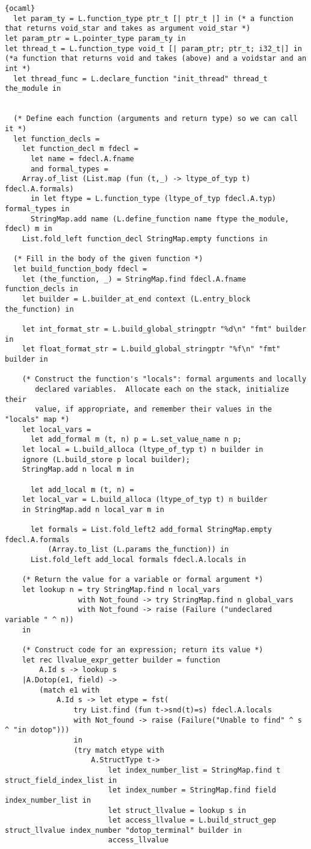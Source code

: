 \begin{lstlisting}{ocaml}
  let param_ty = L.function_type ptr_t [| ptr_t |] in (* a function that returns void_star and takes as argument void_star *)
let param_ptr = L.pointer_type param_ty in  
let thread_t = L.function_type void_t [| param_ptr; ptr_t; i32_t|] in (*a function that returns void and takes (above) and a voidstar and an int *)
  let thread_func = L.declare_function "init_thread" thread_t the_module in


  (* Define each function (arguments and return type) so we can call it *)
  let function_decls =
    let function_decl m fdecl =
      let name = fdecl.A.fname
      and formal_types =
	Array.of_list (List.map (fun (t,_) -> ltype_of_typ t) fdecl.A.formals)
      in let ftype = L.function_type (ltype_of_typ fdecl.A.typ) formal_types in
      StringMap.add name (L.define_function name ftype the_module, fdecl) m in
    List.fold_left function_decl StringMap.empty functions in
  
  (* Fill in the body of the given function *)
  let build_function_body fdecl =
    let (the_function, _) = StringMap.find fdecl.A.fname function_decls in
    let builder = L.builder_at_end context (L.entry_block the_function) in

    let int_format_str = L.build_global_stringptr "%d\n" "fmt" builder in
    let float_format_str = L.build_global_stringptr "%f\n" "fmt" builder in   
 
    (* Construct the function's "locals": formal arguments and locally
       declared variables.  Allocate each on the stack, initialize their
       value, if appropriate, and remember their values in the "locals" map *)
    let local_vars =
      let add_formal m (t, n) p = L.set_value_name n p;
	let local = L.build_alloca (ltype_of_typ t) n builder in
	ignore (L.build_store p local builder);
	StringMap.add n local m in

      let add_local m (t, n) =
	let local_var = L.build_alloca (ltype_of_typ t) n builder
	in StringMap.add n local_var m in

      let formals = List.fold_left2 add_formal StringMap.empty fdecl.A.formals
          (Array.to_list (L.params the_function)) in
      List.fold_left add_local formals fdecl.A.locals in

    (* Return the value for a variable or formal argument *)
    let lookup n = try StringMap.find n local_vars
                 with Not_found -> try StringMap.find n global_vars
                 with Not_found -> raise (Failure ("undeclared variable " ^ n))
    in

    (* Construct code for an expression; return its value *)
    let rec llvalue_expr_getter builder = function
     	A.Id s -> lookup s
	|A.Dotop(e1, field) ->
		(match e1 with
			A.Id s -> let etype = fst( 
				try List.find (fun t->snd(t)=s) fdecl.A.locals
				with Not_found -> raise (Failure("Unable to find" ^ s ^ "in dotop")))
				in
				(try match etype with
					A.StructType t->
						let index_number_list = StringMap.find t struct_field_index_list in
						let index_number = StringMap.find field index_number_list in
						let struct_llvalue = lookup s in
						let access_llvalue = L.build_struct_gep struct_llvalue index_number "dotop_terminal" builder in
						access_llvalue


\end{lstlisting}
